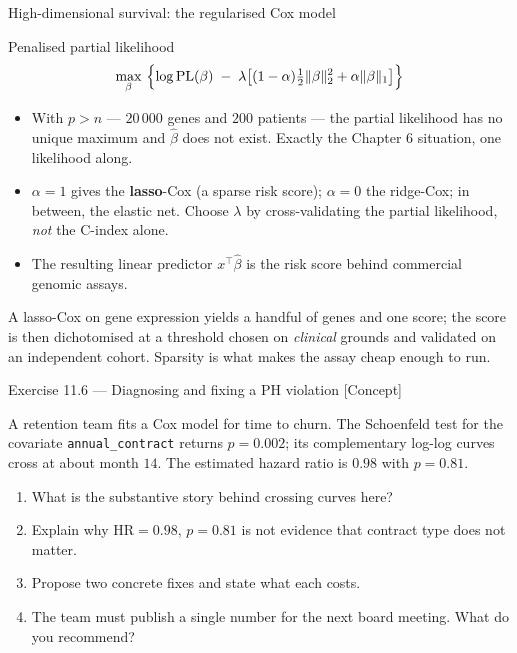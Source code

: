 \documentclass[aspectratio=169,11pt]{beamer}
\begin{document}
\begin{frame}{High-dimensional survival: the regularised Cox model}
  \footnotesize
  \begin{block}{Penalised partial likelihood}
    \[
      \max_{\beta}\ \Bigl\{\log \mathrm{PL}(\beta)
        \;-\;\lambda\bigl[(1-\alpha)\tfrac12\|\beta\|_2^2+\alpha\|\beta\|_1\bigr]\Bigr\}
    \]
  \end{block}
  \begin{readme}
    \begin{itemize}
      \item With $p>n$ --- $20\,000$ genes and $200$ patients --- the partial likelihood
            has no unique maximum and $\hat\beta$ does not exist. Exactly the Chapter 6
            situation, one likelihood along.
      \item $\alpha=1$ gives the \textbf{lasso}-Cox (a sparse risk score); $\alpha=0$ the
            ridge-Cox; in between, the elastic net. Choose $\lambda$ by cross-validating
            the partial likelihood, \emph{not} the C-index alone.
      \item The resulting linear predictor $x^\top\hat\beta$ is the risk score behind
            commercial genomic assays.
    \end{itemize}
  \end{readme}
  \begin{industry}
  \scriptsize
    A lasso-Cox on gene expression yields a handful of genes and one score; the score is
    then dichotomised at a threshold chosen on \emph{clinical} grounds and validated on an
    independent cohort. Sparsity is what makes the assay cheap enough to run.
  \end{industry}
\end{frame}

\begin{frame}{Exercise 11.6 --- Diagnosing and fixing a PH violation [Concept]}
\begin{exercise}
  A retention team fits a Cox model for time to churn. The Schoenfeld test for the
  covariate \texttt{annual\_contract} returns $p=0.002$; its complementary log-log curves
  cross at about month $14$. The estimated hazard ratio is $0.98$ with $p=0.81$.
  \begin{enumerate}
    \item What is the substantive story behind crossing curves here?
    \item Explain why $\mathrm{HR}=0.98$, $p=0.81$ is not evidence that contract type
          does not matter.
    \item Propose two concrete fixes and state what each costs.
    \item The team must publish a single number for the next board meeting. What do you
          recommend?
  \end{enumerate}
\end{exercise}
\end{frame}
\end{document}
